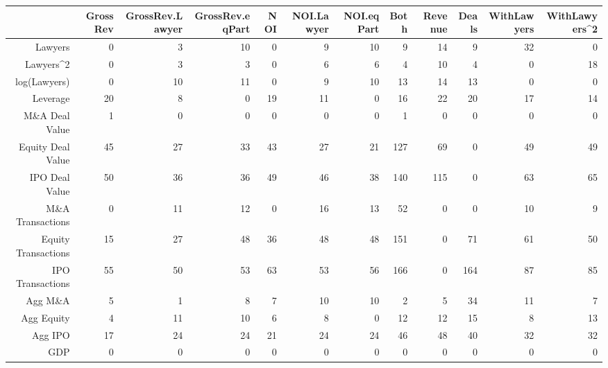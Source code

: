 \documentclass{article}
\begin{document}
\begin{table}[H]
\centering
\begin{tabular}{rrrrrrrrrrrr}
  \hline
 & GrossRev & GrossRev.Lawyer & GrossRev.eqPart & NOI & NOI.Lawyer & NOI.eqPart & Both & Revenue & Deals & WithLawyers & WithLawyers^2 \\ 
  \hline
Lawyers & 0 & 3 & 10 & 0 & 9 & 10 & 9 & 14 & 9 & 32 & 0 \\ 
  Lawyers^2 & 0 & 3 & 3 & 0 & 6 & 6 & 4 & 10 & 4 & 0 & 18 \\ 
  log(Lawyers) & 0 & 10 & 11 & 0 & 9 & 10 & 13 & 14 & 13 & 0 & 0 \\ 
  Leverage & 20 & 8 & 0 & 19 & 11 & 0 & 16 & 22 & 20 & 17 & 14 \\ 
  M\&A Deal Value & 1 & 0 & 0 & 0 & 0 & 0 & 1 & 0 & 0 & 0 & 0 \\ 
  Equity Deal Value & 45 & 27 & 33 & 43 & 27 & 21 & 127 & 69 & 0 & 49 & 49 \\ 
  IPO Deal Value & 50 & 36 & 36 & 49 & 46 & 38 & 140 & 115 & 0 & 63 & 65 \\ 
  M\&A Transactions & 0 & 11 & 12 & 0 & 16 & 13 & 52 & 0 & 0 & 10 & 9 \\ 
  Equity Transactions & 15 & 27 & 48 & 36 & 48 & 48 & 151 & 0 & 71 & 61 & 50 \\ 
  IPO Transactions & 55 & 50 & 53 & 63 & 53 & 56 & 166 & 0 & 164 & 87 & 85 \\ 
  Agg M\&A & 5 & 1 & 8 & 7 & 10 & 10 & 2 & 5 & 34 & 11 & 7 \\ 
  Agg Equity & 4 & 11 & 10 & 6 & 8 & 0 & 12 & 12 & 15 & 8 & 13 \\ 
  Agg IPO & 17 & 24 & 24 & 21 & 24 & 24 & 46 & 48 & 40 & 32 & 32 \\ 
  GDP & 0 & 0 & 0 & 0 & 0 & 0 & 0 & 0 & 0 & 0 & 0 \\ 
   \hline
\end{tabular}
\end{table}
\end{document}
